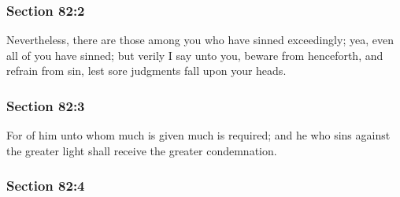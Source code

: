 
	\subsubsection{Section 82:2} %
		\label{DC82-2}

		Nevertheless, there are those among you who have sinned exceedingly; yea, even all of you have sinned; but verily I say unto you, beware from henceforth, and refrain from sin, lest sore judgments fall upon your heads.


	\subsubsection{Section 82:3} %
		\label{DC82-3}

		For of him unto whom much is given much is required; and he who sins against the greater light shall receive the greater condemnation.


	\subsubsection{Section 82:4} %
		\label{DC82-4}

